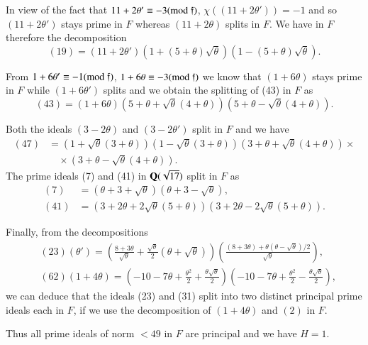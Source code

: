 In view of the fact that $11+2\theta'\equiv -3(\rm{mod} \;\mathfrak{f})$,
$\chi((11+2\theta'))=-1$ and so $(11+2\theta')$ stays prime in $F$
whereas $(11+2\theta)$ splits in $F$. We have in $F$ therefore the
decomposition
$$
(19)=(11+2\theta')(1+(5+\theta)\sqrt{\theta})(1-(5+\theta)\sqrt{\theta}).
$$\pageoriginale

From $1+6\theta'\equiv -1(\rm{mod} \;\mathfrak{f})$, $1+6\theta\equiv
-3(\rm{mod} \; \mathfrak{f})$ we know that $(1+6\theta)$ stays prime
in $F$ 
while $(1+6\theta')$ splits and we obtain the splitting of (43) in $F$
as
$$
(43)=(1+6\theta)(5+\theta+\sqrt{\theta}(4+\theta))(5+\theta-\sqrt{\theta}(4+\theta)).
$$

Both the ideals $(3-2\theta)$ and $(3-2\theta')$ split in $F$ and we
have
\begin{align*}
(47) &=
  (1+\sqrt{\theta}(3+\theta))(1-\sqrt{\theta}(3+\theta))(3+\theta+\sqrt{\theta}(4+\theta))\times\\
&\quad \times(3+\theta-\sqrt{\theta}(4+\theta)).
\end{align*}
The prime ideals (7) and (41) in $\mathbf{Q}(\sqrt{17})$ split in $F$ as
\begin{align*}
(7) &= (\theta+3+\sqrt{\theta})(\theta+3-\sqrt{\theta}),\\
(41) &=
  (3+2\theta+2\sqrt{\theta}(5+\theta))(3+2\theta-2\sqrt{\theta}(5+\theta)). 
\end{align*}

Finally, from the decompositions
\begin{align*}
&
  (23)(\theta')=\left(\frac{8+3\theta}{\sqrt{\theta}}+\frac{\sqrt{\theta}}{2}(\theta+\sqrt{\theta})\right)\left(\frac{(8+3\theta)+\theta(\theta-\sqrt{\theta})/2}{\sqrt{\theta}}\right),\\
&(62)(1+4\theta)=\left(-10-7\theta+\frac{\theta^{2}}{2}+\frac{\theta\sqrt{\theta}}{2}\right)\left(-10-7\theta+\frac{\theta^{2}}{2}-\frac{\theta\sqrt{\theta}}{2}\right), 
\end{align*}
we can deduce that the ideals (23) and (31) split into two distinct
principal prime ideals each in $F$, if we use the decomposition of
$(1+4\theta)$ and $(2)$ in $F$.

Thus all prime ideals of norm $<49$ in $F$ are principal and we have
$H=1$.

